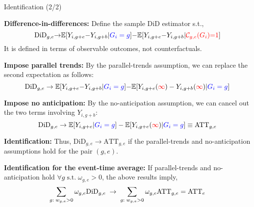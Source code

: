 \documentclass[usenames,dvipsnames]{beamer}
\begin{document}
\begin{frame}{Identification (2/2)}

\textbf{Difference-in-differences:} Define the sample DiD estimator s.t.,
\begin{equation} \notag 
\text{DiD}_{g,e} {\rightarrow}  \mathbb{E}[Y_{i,g+e} {-} Y_{i,g+b} | {\color{blue} G_i = g }] {-}
\mathbb{E}[Y_{i,g+e} {-} Y_{i,g+b} | {\color{red} \mathcal{C}_{g,e}(G_i)  {=} 1}]
\end{equation}
It is defined in terms of observable outcomes, not counterfactuals.

\textbf{Impose parallel trends:}  By the parallel-trends assumption, we can replace the second expectation as follows:
\begin{equation} \notag 
\text{DiD}_{g,e} \rightarrow  \mathbb{E}[Y_{i,g+e} {-} Y_{i,g+b} | {\color{blue} G_i = g }] {-}
\mathbb{E}[Y_{i,g+e}({\color{red} \infty}) - Y_{i,g+b}({\color{red} \infty}) | {\color{blue}G_i = g}]
\end{equation}

\textbf{Impose no anticipation:} By the no-anticipation assumption, we can cancel out the two terms involving $Y_{i,g+b}$:
\begin{equation} \notag 
\text{DiD}_{g,e} \rightarrow  \mathbb{E}[Y_{i,g+e}  | {\color{blue} G_i = g }] -
\mathbb{E}[Y_{i,g+e}({\color{red} \infty})  | {\color{blue}G_i = g}]
\equiv
\text{ATT}_{g,e}
\end{equation}

\vspace{-0.05cm}

\textbf{Identification:} Thus, $\text{DiD}_{g,e} \rightarrow \text{ATT}_{g,e}$ if the parallel-trends and no-anticipation assumptions hold for the pair $(g,e)$. 

\textbf{Identification for the event-time average:} If  parallel-trends and no-anticipation hold $\forall g \; \text{s.t.} \; \omega_{g,e}>0$, the above results imply,
\begin{equation} \notag 
\sum_{g:\; w_{g,e}>0} \omega_{g,e} \text{DiD}_{g,e} \; \rightarrow \; \sum_{g:\; w_{g,e}>0} \omega_{g,e} \text{ATT}_{g,e} =  \text{ATT}_{e}  
\end{equation}

\vspace{-0.05cm}

\end{frame}


 
\end{document}
